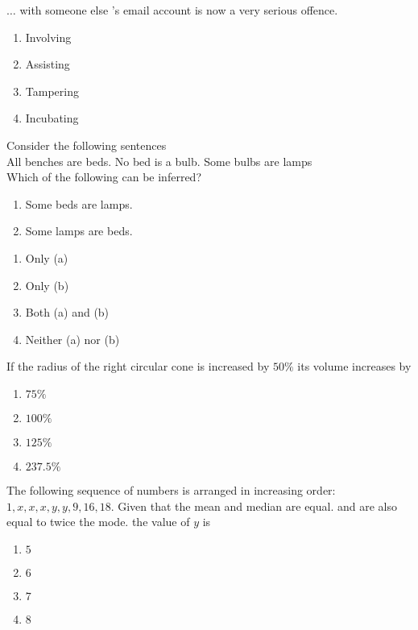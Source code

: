     \item $\dots$ with someone else 's email account is now a very serious offence.
    \begin{multicols}{4}
        \begin{enumerate}
            \item Involving
            \item Assisting
            \item Tampering
            \item Incubating
        \end{enumerate}
    \end{multicols}

    \item Consider the following sentences\\
    All benches are beds. No bed is a bulb. Some bulbs are lamps \\
    Which of the following can be inferred?
    \begin{enumerate}
    \item Some beds are lamps.
    \item Some lamps are beds.
    \end{enumerate}

    \begin{multicols}{2}
        \begin{enumerate}
            \item Only (a)
            \item Only (b)
            \item Both (a) and (b)
            \item Neither (a) nor (b)
        \end{enumerate}
    \end{multicols}


    \item If the radius of the right circular cone is increased by $50 \%$ its volume increases by
    \begin{multicols}{4}
        \begin{enumerate}
            \item $75 \%$
            \item $100 \%$
            \item $125 \%$
            \item $237.5 \%$
        \end{enumerate}
    \end{multicols}

    \item The following sequence of numbers is arranged in increasing order: $1, x, x, x, y, y, 9, 16, 18$. Given that the mean and median are equal. and are also equal to twice the mode. the value of $y$ is
    \begin{multicols}{4}
        \begin{enumerate}
            \item $5$
            \item $6$
            \item $7$
            \item $8$
        \end{enumerate}
    \end{multicols}

